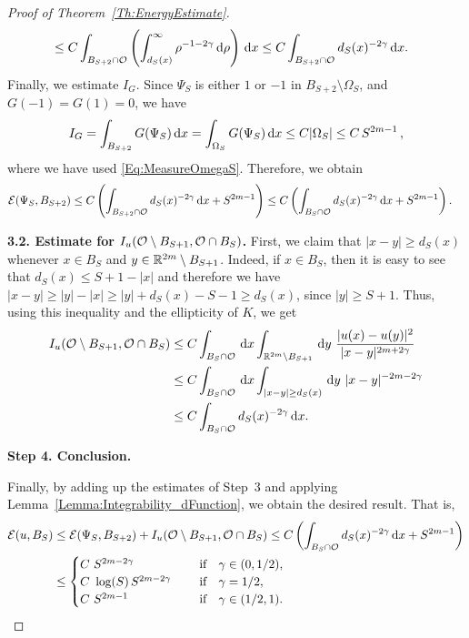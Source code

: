 \begin{proof}[Proof of Theorem~\ref{Th:EnergyEstimate}]
\begin{align*}
&\leq C \int_{B_{S+2} \cap \mathcal{O}} \left(\int_{d_S(x)}^\infty \rho^{-1-2\gamma} \,\mathrm{d} \rho \right)\,\mathrm{d} x \leq C \int_{B_{S+2} \cap \mathcal{O}} d_S(x)^{-2\gamma} \,\mathrm{d} x.
\end{align*}
Finally, we estimate $I_G$. Since $\Psi_S$ is either $1$ or $-1$ in $B_{S+2}\setminus \Omega_S$, and $G(-1)=G(1)=0$, we have
\begin{align*}
I_G = \int_{B_{S+2}} G(\Psi_S) \,\mathrm{d} x= \int_{\Omega_S} G(\Psi_S)\,\mathrm{d} x \leq C | \Omega_S| \leq C\,S^{2m-1}\,,
\end{align*}
where we have used \eqref{Eq:MeasureOmegaS}. Therefore, we obtain
\begin{align*}
\mathcal{E}(\Psi_S,B_{S+2}) &\leq C \left(\int_{B_{S+2} \cap \mathcal{O}} d_S(x)^{-2\gamma} \,\mathrm{d} x + S^{2m-1} \right)\leq C\left(\int_{B_{S} \cap \mathcal{O}} d_S(x)^{-2\gamma} \,\mathrm{d} x + S^{2m-1} \right).
\end{align*}


\textbf{3.2. Estimate for $I_u(\mathcal{O} \setminus B_{S+1}, \mathcal{O} \cap B_S)$.} First, we claim that $|x-y|\geq d_S(x)$ whenever $x\in B_S$ and $y\in \mathbb{R}^{2m}\setminus B_{S+1}$. Indeed, if $x\in B_S$, then it is easy to see that $d_S(x) \leq S+1-|x|$ and therefore we have $|x-y|\geq |y|-|x|\geq |y|+d_S(x)-S-1 \geq  d_S(x)$, since $|y| \geq S+1$. Thus, using this inequality and the ellipticity of $K$, we get
\begin{align*}
I_u(\ocal \setminus B_{S+1}, \ocal \cap B_S) &\leq C \int_{B_S \cap \ocal} \d x \int_{\R^{2m}\setminus B_{S+1}} \d y \ \frac{|u(x)-u(y)|^2}{|x-y|^{2m+2\s}} \\
& \leq C \int_{B_S \cap \ocal} \d x \int_{|x-y|\geq d_S(x)} \d y \ |x-y|^{-2m-2\s} \\
&\leq C \int_{B_S \cap \ocal} d_S(x)^{-2\s} \d x.
\end{align*}

\textbf{Step 4. Conclusion.}

Finally, by adding up the estimates of Step~3 and applying Lemma~\ref{Lemma:Integrability_dFunction}, we obtain the desired result. That is,
\begin{align*}
\mathcal{E}(u,B_S) &\leq \mathcal{E}(\Psi_S,B_{S+2}) + I_u(\mathcal{O} \setminus B_{S+1}, \mathcal{O} \cap B_S) \leq C\left(\int_{B_S \cap \mathcal{O}} d_S(x)^{-2\gamma} \,\mathrm{d} x + S^{2m-1} \right)\\
&\leq \begin{cases}
C \ S^{2m-2\gamma}\ \ \ &\textrm{if } \ \ \gamma\in(0,1/2),\\
C\ \log(S)\,S^{2m-2\gamma}\ \ \ \ &\textrm{if } \ \ \gamma=1/2,\\
C \ S^{2m-1}\ \ \ \ &\textrm{if } \ \ \gamma\in(1/2,1).\\
\end{cases}
\end{align*}
\end{proof}
